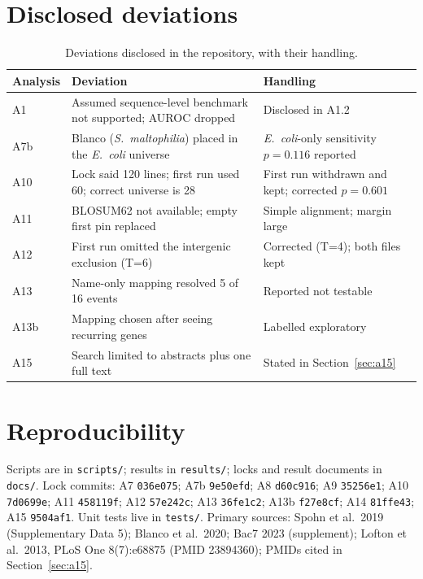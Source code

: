 \documentclass[11pt,letterpaper]{article}
\newcommand{\toprule}{\hline}\newcommand{\midrule}{\hline}\newcommand{\bottomrule}{\hline}
\begin{document}
\section{Disclosed deviations}
\begin{table}[!h]\centering\small\caption{Deviations disclosed in the repository, with their handling.}\label{tab:dev}
\begin{tabular}{p{}p{}p{}}\toprule Analysis & Deviation & Handling\\\midrule
A1 & Assumed sequence-level benchmark not supported; AUROC dropped & Disclosed in A1.2\\
A7b & Blanco (\textit{S.\ maltophilia}) placed in the \textit{E.\ coli} universe & \textit{E.\ coli}-only sensitivity $p=0.116$ reported\\
A10 & Lock said 120 lines; first run used 60; correct universe is 28 & First run withdrawn and kept; corrected $p=0.601$\\
A11 & BLOSUM62 not available; empty first pin replaced & Simple alignment; margin large\\
A12 & First run omitted the intergenic exclusion (T=6) & Corrected (T=4); both files kept\\
A13 & Name-only mapping resolved 5 of 16 events & Reported not testable\\
A13b & Mapping chosen after seeing recurring genes & Labelled exploratory\\
A15 & Search limited to abstracts plus one full text & Stated in Section~\ref{sec:a15}\\\bottomrule\end{tabular}\end{table}

\section{Reproducibility}
Scripts are in \texttt{scripts/}; results in \texttt{results/}; locks and result documents in \texttt{docs/}. Lock commits: A7 \texttt{036e075}; A7b \texttt{9e50efd}; A8 \texttt{d60c916}; A9 \texttt{35256e1}; A10 \texttt{7d0699e}; A11 \texttt{458119f}; A12 \texttt{57e242c}; A13 \texttt{36fe1c2}; A13b \texttt{f27e8cf}; A14 \texttt{81ffe43}; A15 \texttt{9504af1}. Unit tests live in \texttt{tests/}. Primary sources: Spohn et al.\ 2019 (Supplementary Data 5); Blanco et al.\ 2020; Bac7 2023 (supplement); Lofton et al.\ 2013, PLoS One 8(7):e68875 (PMID 23894360); PMIDs cited in Section~\ref{sec:a15}.
\end{document}
